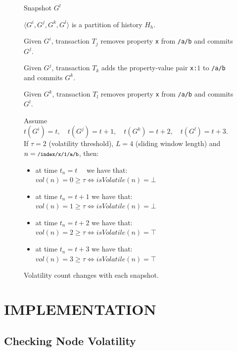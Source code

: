 \documentclass[abstracton,12pt]{scrreprt}
\begin{document}
\begin{figure}[h]
\begin{scriptsize}
\begin{multicols}{4}
\begin{center}
{                    \vspace{27mm}
                }

                Snapshot $G^l$
            \end{center}
        \end{multicols}
    \end{scriptsize}
    $\langle G^i,G^j,G^k,G^l \rangle$ is a partition of history $H_h$.
    
    Given $G^i$, transaction $T_j$ removes property \texttt{x} from \texttt{/a/b} and commits $G^j$.
    
    Given $G^j$, transaction $T_k$ adds the property-value pair \texttt{x:}$1$ to \texttt{/a/b} and commits $G^k$.
    
    Given $G^k$, transaction $T_l$ removes property \texttt{x} from \texttt{/a/b} and commits $G^l$.

    Assume $t(G^i) = t, \quad t(G^j) = t + 1, \quad t(G^k) = t + 2, \quad t(G^l) = t + 3$.
    If $\tau = 2$ (volatility threshold), $L = 4$ (sliding window length) and $n = \texttt{\footnotesize /index/x/1/a/b}$, then:
    \begin{itemize}
        \item at time $t_n = t$ \quad \ \ we have that: $ vol(n) = 0 \geq \tau\iff isVolatile(n) = \bot$
        \item at time $t_n = t + 1 $ we have that: $ vol(n) = 1 \geq \tau \iff isVolatile(n) = \bot$
        \item at time $t_n = t + 2 $ we have that: $ vol(n) = 2 \geq \tau \iff isVolatile(n) = \top$
        \item at time $t_n = t + 3 $ we have that: $ vol(n) = 3 \geq \tau \iff isVolatile(n) = \top$
    \end{itemize}    
    \caption{Volatility count changes with each snapshot.}
    \label{fig:vol_example}
\end{figure}

\chapter{IMPLEMENTATION}

\section{Checking Node Volatility}
\end{document}
